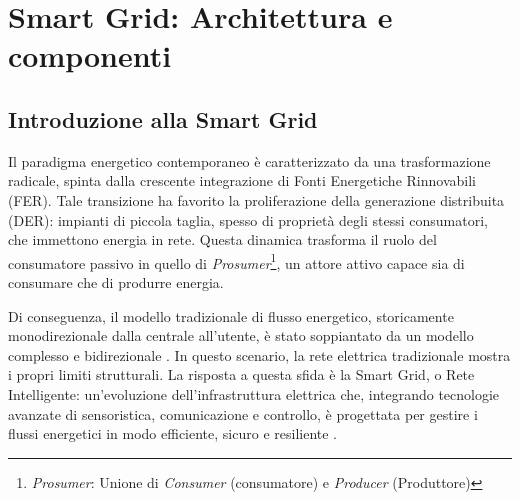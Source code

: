\newpage
\chapter{Smart Grid: Architettura e componenti}

\section{Introduzione alla Smart Grid}




Il paradigma energetico contemporaneo è caratterizzato da una trasformazione radicale, spinta dalla crescente integrazione di Fonti Energetiche Rinnovabili (FER). Tale transizione ha favorito la proliferazione della generazione distribuita (DER): impianti di piccola taglia, spesso di proprietà degli stessi consumatori, che immettono energia in rete. Questa dinamica trasforma il ruolo del consumatore passivo in quello di \textit{Prosumer}\footnote{\textit{Prosumer}: Unione di \textit{Consumer} (consumatore) e \textit{Producer} (Produttore)}, un attore attivo capace sia di consumare che di produrre energia. \label{prosumer}



Di conseguenza, il modello tradizionale di flusso energetico, storicamente monodirezionale dalla centrale all'utente, è stato soppiantato da un modello complesso e bidirezionale \cite{Enel}. In questo scenario, la rete elettrica tradizionale mostra i propri limiti strutturali. La risposta a questa sfida è la Smart Grid, o Rete Intelligente: un'evoluzione dell'infrastruttura elettrica che, integrando tecnologie avanzate di sensoristica, comunicazione e controllo, è progettata per gestire i flussi energetici in modo efficiente, sicuro e resiliente \cite{en15186799}.







